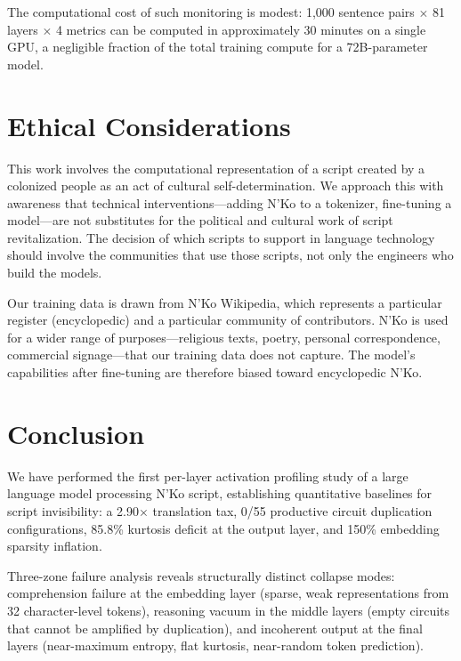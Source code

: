 \documentclass[11pt]{article}
\begin{document}
The computational cost of such monitoring is modest: 1,000 sentence pairs $\times$ 81 layers $\times$ 4 metrics can be computed in approximately 30 minutes on a single GPU, a negligible fraction of the total training compute for a 72B-parameter model.

\section{Ethical Considerations}

This work involves the computational representation of a script created by a colonized people as an act of cultural self-determination.
We approach this with awareness that technical interventions---adding N'Ko to a tokenizer, fine-tuning a model---are not substitutes for the political and cultural work of script revitalization.
The decision of which scripts to support in language technology should involve the communities that use those scripts, not only the engineers who build the models.

Our training data is drawn from N'Ko Wikipedia, which represents a particular register (encyclopedic) and a particular community of contributors.
N'Ko is used for a wider range of purposes---religious texts, poetry, personal correspondence, commercial signage---that our training data does not capture.
The model's capabilities after fine-tuning are therefore biased toward encyclopedic N'Ko.

\section{Conclusion}

We have performed the first per-layer activation profiling study of a large language model processing N'Ko script, establishing quantitative baselines for script invisibility: a 2.90$\times$ translation tax, 0/55 productive circuit duplication configurations, 85.8\% kurtosis deficit at the output layer, and 150\% embedding sparsity inflation.

Three-zone failure analysis reveals structurally distinct collapse modes: comprehension failure at the embedding layer (sparse, weak representations from 32 character-level tokens), reasoning vacuum in the middle layers (empty circuits that cannot be amplified by duplication), and incoherent output at the final layers (near-maximum entropy, flat kurtosis, near-random token prediction).
\end{document}
